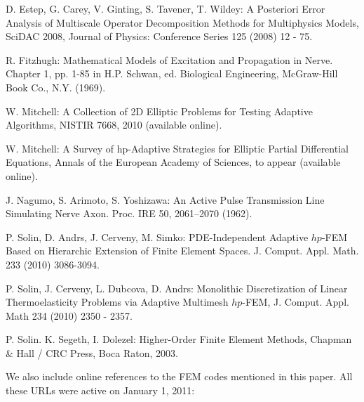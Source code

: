 \begin{thebibliography}{[KLR73]}

D. Estep, G. Carey, V. Ginting, S. Tavener, T. Wildey:
A Posteriori Error Analysis of Multiscale Operator
Decomposition Methods for Multiphysics Models, SciDAC 2008,
Journal of Physics: Conference Series 125 (2008) 12 - 75.

R. Fitzhugh: Mathematical Models of Excitation and Propagation in Nerve.
Chapter 1, pp. 1-85 in H.P. Schwan, ed. Biological Engineering,
McGraw-Hill Book Co., N.Y. (1969).

W. Mitchell: A Collection of 2D Elliptic Problems for
Testing Adaptive Algorithms, NISTIR 7668, 2010 (available online).

W. Mitchell: A Survey of hp-Adaptive Strategies for Elliptic Partial Differential Equations,
Annals of the European Academy of Sciences, to appear (available online).

J. Nagumo, S. Arimoto, S. Yoshizawa:
An Active Pulse Transmission Line Simulating Nerve Axon. Proc. IRE 50, 2061–2070 (1962).

P. Solin, D. Andrs, J. Cerveny, M. Simko:
PDE-Independent Adaptive $hp$-FEM Based on Hierarchic Extension of Finite Element Spaces.
J. Comput. Appl. Math. 233 (2010) 3086-3094.

P. Solin, J. Cerveny, L. Dubcova, D. Andrs:
Monolithic Discretization of Linear Thermoelasticity Problems
via Adaptive Multimesh $hp$-FEM, J. Comput. Appl. Math 234 (2010) 2350 - 2357.

P. Solin. K. Segeth, I. Dolezel: Higher-Order Finite Element Methods, Chapman \& Hall
/ CRC Press, Boca Raton, 2003.
\end{thebibliography}

\vbox{}
\vspace{6mm}
We also include online references to the FEM codes mentioned in this paper.
All these URLs were active on January 1, 2011:

